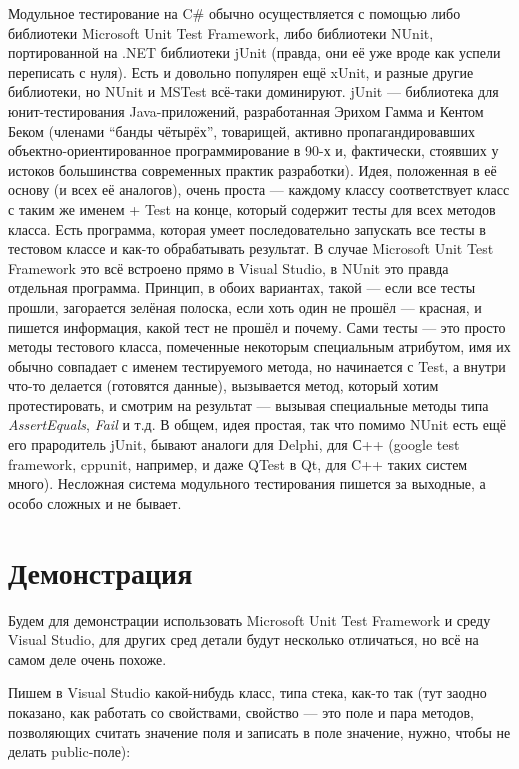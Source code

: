 \documentclass{../../text-style}
\begin{document}
Модульное тестирование на C\# обычно осуществляется с помощью либо библиотеки Microsoft Unit Test Framework, либо библиотеки NUnit, портированной на .NET библиотеки jUnit (правда, они её уже вроде как успели переписать с нуля). Есть и довольно популярен ещё xUnit, и разные другие библиотеки, но NUnit и MSTest всё-таки доминируют. jUnit --- библиотека для юнит-тестирования Java-приложений, разработанная Эрихом Гамма и Кентом Беком (членами \enquote{банды чётырёх}, товарищей, активно пропагандировавших объектно-ориентированное программирование в 90-х и, фактически, стоявших у истоков большинства современных практик разработки). Идея, положенная в её основу (и всех её аналогов), очень проста --- каждому классу соответствует класс с таким же именем + Test на конце, который содержит тесты для всех методов класса. Есть программа, которая умеет последовательно запускать все тесты в тестовом классе и как-то обрабатывать результат. В случае Microsoft Unit Test Framework это всё встроено прямо в Visual Studio, в NUnit это правда отдельная программа. Принцип, в обоих вариантах, такой --- если все тесты прошли, загорается зелёная полоска, если хоть один не прошёл --- красная, и пишется информация, какой тест не прошёл и почему. Сами тесты --- это просто методы тестового класса, помеченные некоторым специальным атрибутом, имя их обычно совпадает с именем тестируемого метода, но начинается с Test, а внутри что-то делается (готовятся данные), вызывается метод, который хотим протестировать, и смотрим на результат --- вызывая специальные методы типа \textit{AssertEquals}, \textit{Fail} и т.д. В общем, идея простая, так что помимо NUnit есть ещё его прародитель jUnit, бывают аналоги для Delphi, для С++ (google test framework, cppunit, например, и даже QTest в Qt, для C++ таких систем много). Несложная система модульного тестирования пишется за выходные, а особо сложных и не бывает.

\section{Демонстрация}

Будем для демонстрации использовать Microsoft Unit Test Framework и среду Visual Studio, для других сред детали будут несколько отличаться, но всё на самом деле очень похоже.

Пишем в Visual Studio какой-нибудь класс, типа стека, как-то так (тут заодно показано, как работать со свойствами, свойство --- это поле и пара методов, позволяющих считать значение поля и записать в поле значение, нужно, чтобы не делать public-поле):
\end{document}
